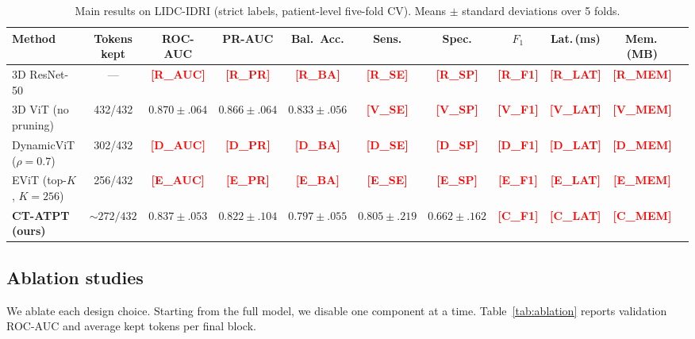 \documentclass[journal]{IEEEtran}
\newcommand{\R}[1]{\textcolor{red}{\textbf{[#1]}}}
\begin{document}
\begin{table}[t]
\centering
\caption{Main results on LIDC-IDRI (strict labels, patient-level five-fold
CV). Means $\pm$ standard deviations over 5 folds.}
\label{tab:main}
\begin{tabular}{lcccccccccc}
\toprule
\textbf{Method} & \textbf{Tokens kept} & \textbf{ROC-AUC} & \textbf{PR-AUC} &
\textbf{Bal.\ Acc.} & \textbf{Sens.} & \textbf{Spec.} & \textbf{$F_1$} &
\textbf{Lat.\,(ms)} & \textbf{Mem.\,(MB)} \\
\midrule
3D ResNet-50               & ---           & \R{R\_AUC}     & \R{R\_PR}      & \R{R\_BA}     & \R{R\_SE}     & \R{R\_SP}     & \R{R\_F1}     & \R{R\_LAT}     & \R{R\_MEM}     \\
3D ViT (no pruning)        & 432/432       & $0.870\pm.064$ & $0.866\pm.064$ & $0.833\pm.056$ & \R{V\_SE}    & \R{V\_SP}     & \R{V\_F1}     & \R{V\_LAT}     & \R{V\_MEM}     \\
DynamicViT ($\rho{=}0.7$)  & 302/432       & \R{D\_AUC}     & \R{D\_PR}      & \R{D\_BA}     & \R{D\_SE}     & \R{D\_SP}     & \R{D\_F1}     & \R{D\_LAT}     & \R{D\_MEM}     \\
EViT (top-$K$, $K{=}256$)  & 256/432       & \R{E\_AUC}     & \R{E\_PR}      & \R{E\_BA}     & \R{E\_SE}     & \R{E\_SP}     & \R{E\_F1}     & \R{E\_LAT}     & \R{E\_MEM}     \\
\midrule
\textbf{CT-ATPT (ours)}    & ${\sim}272/432$ & $0.837\pm.053$ & $0.822\pm.104$ &
$0.797\pm.055$ & $0.805\pm.219$ & $0.662\pm.162$ & \R{C\_F1} &
\R{C\_LAT} & \R{C\_MEM} \\
\bottomrule
\end{tabular}
\end{table}

\subsection{Ablation studies}
We ablate each design choice. Starting from the full model, we disable one
component at a time. Table~\ref{tab:ablation} reports validation ROC-AUC and
average kept tokens per final block.
\end{document}
